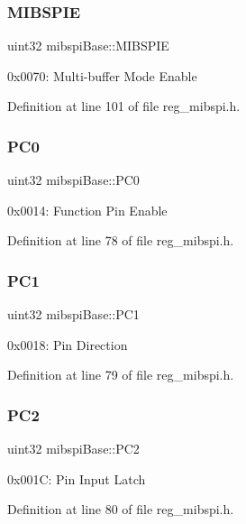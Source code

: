 \subsubsection{\texorpdfstring{M\+I\+B\+S\+P\+IE}{MIBSPIE}}
{\footnotesize\ttfamily uint32 mibspi\+Base\+::\+M\+I\+B\+S\+P\+IE}

0x0070\+: Multi-\/buffer Mode Enable 

Definition at line 101 of file reg\+\_\+mibspi.\+h.

\mbox{\label{structmibspiBase_a9b97fd409665ce9822fcd2a47e6735de}} 
\subsubsection{\texorpdfstring{P\+C0}{PC0}}
{\footnotesize\ttfamily uint32 mibspi\+Base\+::\+P\+C0}

0x0014\+: Function Pin Enable 

Definition at line 78 of file reg\+\_\+mibspi.\+h.

\mbox{\label{structmibspiBase_ac6e28f7a6924f52cf294a11ca4047bed}} 
\subsubsection{\texorpdfstring{P\+C1}{PC1}}
{\footnotesize\ttfamily uint32 mibspi\+Base\+::\+P\+C1}

0x0018\+: Pin Direction 

Definition at line 79 of file reg\+\_\+mibspi.\+h.

\mbox{\label{structmibspiBase_a20c0e9faa6917832f56e6867becacf52}} 
\subsubsection{\texorpdfstring{P\+C2}{PC2}}
{\footnotesize\ttfamily uint32 mibspi\+Base\+::\+P\+C2}

0x001C\+: Pin Input Latch 

Definition at line 80 of file reg\+\_\+mibspi.\+h.

\mbox{\label{structmibspiBase_a2aeece31333b3495193f6f7b788fea5c}} 

